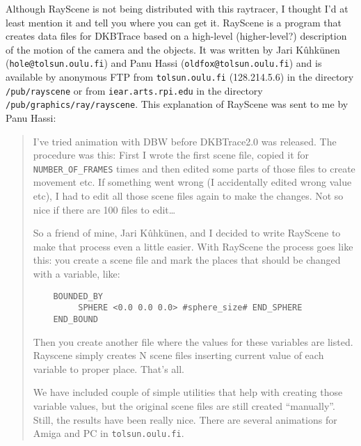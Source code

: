 Although RayScene is not being distributed with this raytracer, I thought I'd
at least mention it and tell you where you can get it.  RayScene is a program
that creates data files for DKBTrace based on a high-level (higher-level?)
description of the motion of the camera and the objects.  It was written by
Jari K\^{u}hk\"{u}nen ({\tt hole@tolsun.oulu.fi}) and
Panu Hassi ({\tt oldfox@tolsun.oulu.fi}) and
is available by anonymous FTP from {\tt tolsun.oulu.fi} (128.214.5.6) in the
directory {\tt /pub/rayscene}
or from {\tt iear.arts.rpi.edu} in the directory
{\tt /pub/graphics/ray/rayscene}.
This explanation of RayScene was sent to me by Panu Hassi:
\begin{quotation}
I've tried animation with DBW before DKBTrace2.0 was released.  
The procedure was this: First I wrote the first scene file, copied it 
for {\tt NUMBER_OF_FRAMES} times and then edited some parts of those files 
to create movement etc.  If something went wrong (I accidentally edited 
wrong value etc), I had to edit all those scene files again to make the
changes.  Not so nice if there are 100 files to edit\ldots

So a friend of mine, Jari K\^{u}hk\"{u}nen, and I decided to write RayScene to
make that process even a little easier.  With RayScene the process
goes like this:  you create a scene file and mark the places that 
should be changed with a variable, like:
\begin{verbatim}
    BOUNDED_BY                              
         SPHERE <0.0 0.0 0.0> #sphere_size# END_SPHERE
    END_BOUND
\end{verbatim}

Then you create another file where the values for these variables are
listed.  Rayscene simply creates N scene files inserting current value of
each variable to proper place.  That's all.
    
We have included couple of simple utilities that help with creating
those variable values, but the original scene files are still created
``manually''.  Still, the results have been really nice.  There are 
several animations for Amiga and PC in {\tt tolsun.oulu.fi}.
\end{quotation}
